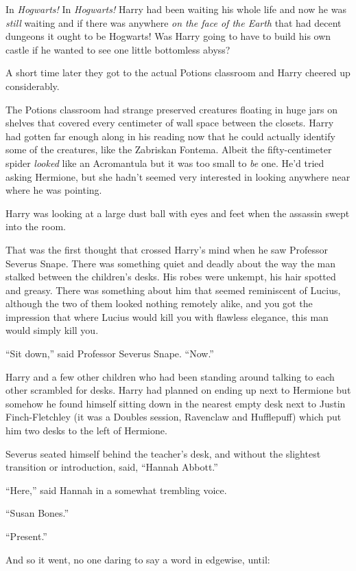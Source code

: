 In \emph{Hogwarts!} In \emph{Hogwarts!} Harry had been waiting his whole life and now he was \emph{still} waiting and if there was anywhere \emph{on the face of the Earth} that had decent dungeons it ought to be Hogwarts! Was Harry going to have to build his own castle if he wanted to see one little bottomless abyss?

A short time later they got to the actual Potions classroom and Harry cheered up considerably.

The Potions classroom had strange preserved creatures floating in huge jars on shelves that covered every centimeter of wall space between the closets. Harry had gotten far enough along in his reading now that he could actually identify some of the creatures, like the Zabriskan Fontema. Albeit the fifty-centimeter spider \emph{looked} like an Acromantula but it was too small to \emph{be} one. He'd tried asking Hermione, but she hadn't seemed very interested in looking anywhere near where he was pointing.

Harry was looking at a large dust ball with eyes and feet when the assassin swept into the room.

That was the first thought that crossed Harry's mind when he saw Professor Severus Snape. There was something quiet and deadly about the way the man stalked between the children's desks. His robes were unkempt, his hair spotted and greasy. There was something about him that seemed reminiscent of Lucius, although the two of them looked nothing remotely alike, and you got the impression that where Lucius would kill you with flawless elegance, this man would simply kill you.

``Sit down,'' said Professor Severus Snape. ``Now.''

Harry and a few other children who had been standing around talking to each other scrambled for desks. Harry had planned on ending up next to Hermione but somehow he found himself sitting down in the nearest empty desk next to Justin Finch-Fletchley (it was a Doubles session, Ravenclaw and Hufflepuff) which put him two desks to the left of Hermione.

Severus seated himself behind the teacher's desk, and without the slightest transition or introduction, said, ``Hannah Abbott.''

``Here,'' said Hannah in a somewhat trembling voice.

``Susan Bones.''

``Present.''

And so it went, no one daring to say a word in edgewise, until:

